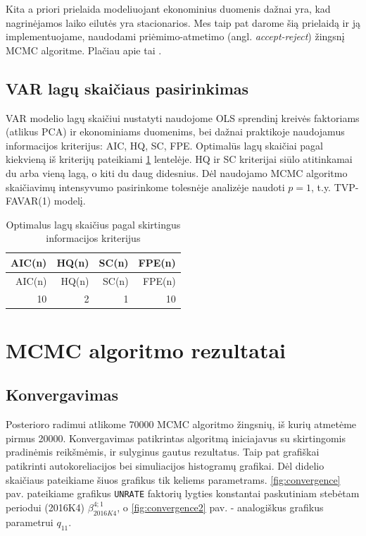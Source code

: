 \documentclass[12pt,lithuanian,]{article}
\begin{document}
Kita a priori prielaida modeliuojant ekonominius duomenis dažnai yra,
kad nagrinėjamos laiko eilutės yra stacionarios. Mes taip pat darome šią
prielaidą ir ją implementuojame, naudodami priėmimo-atmetimo (angl.
\emph{accept-reject}) žingsnį MCMC algoritme. Plačiau apie tai
\citet{CogleySargent2005}.

\subsection{VAR lagų skaičiaus
pasirinkimas}\label{var-lagu-skaiciaus-pasirinkimas}

VAR modelio lagų skaičiui nustatyti naudojome OLS sprendinį kreivės
faktoriams (atlikus PCA) ir ekonominiams duomenims, bei dažnai
praktikoje naudojamus informacijos kriterijus: AIC, HQ, SC, FPE.
Optimalūs lagų skaičiai pagal kiekvieną iš kriterijų pateikiami
\ref{table:VAR_ic} lentelėje. HQ ir SC kriterijai siūlo atitinkamai du
arba vieną lagą, o kiti du daug didesnius. Dėl naudojamo MCMC algoritmo
skaičiavimų intensyvumo pasirinkome tolesnėje analizėje naudoti
\(p = 1\), t.y. TVP-FAVAR(1) modelį.

\begin{longtable}[]{@{}rrrr@{}}
\caption{\label{table:VAR_ic}Optimalus lagų skaičius pagal skirtingus
informacijos kriterijus}\tabularnewline
\toprule
AIC(n) & HQ(n) & SC(n) & FPE(n)\tabularnewline
\midrule
\endfirsthead
\toprule
AIC(n) & HQ(n) & SC(n) & FPE(n)\tabularnewline
\midrule
\endhead
10 & 2 & 1 & 10\tabularnewline
\bottomrule
\end{longtable}

\section{MCMC algoritmo rezultatai}\label{mcmc-algoritmo-rezultatai}

\subsection{Konvergavimas}\label{konvergavimas}

Posterioro radimui atlikome 70000 MCMC algoritmo žingsnių, iš kurių
atmetėme pirmus 20000. Konvergavimas patikrintas algoritmą iniciajavus
su skirtingomis pradinėmis reikšmėmis, ir sulyginus gautus rezultatus.
Taip pat grafiškai patikrinti autokoreliacijos bei simuliacijos
histogramų grafikai. Dėl didelio skaičiaus pateikiame šiuos grafikus tik
keliems parametrams. \ref{fig:convergence} pav. pateikiame grafikus
\texttt{UNRATE} faktorių lygties konstantai paskutiniam stebėtam
periodui (2016K4) \(\beta^{4;1}_{2016K4}\), o \ref{fig:convergence2}
pav. - analogiškus grafikus parametrui \(q_{11}\).
\end{document}
